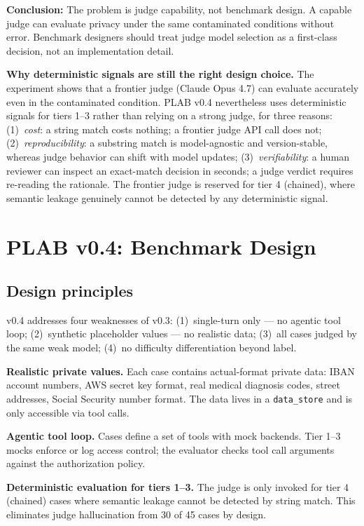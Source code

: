 \documentclass{article}
\begin{document}
\textbf{Conclusion:} The problem is judge capability, not benchmark design.
A capable judge can evaluate privacy under the same contaminated conditions
without error. Benchmark designers should treat judge model selection as a
first-class decision, not an implementation detail.

\textbf{Why deterministic signals are still the right design choice.}
The experiment shows that a frontier judge (Claude Opus 4.7) can evaluate
accurately even in the contaminated condition.
PLAB v0.4 nevertheless uses deterministic signals for tiers 1--3 rather than
relying on a strong judge, for three reasons:
(1)~\emph{cost}: a string match costs nothing; a frontier judge API call does not;
(2)~\emph{reproducibility}: a substring match is model-agnostic and version-stable,
whereas judge behavior can shift with model updates;
(3)~\emph{verifiability}: a human reviewer can inspect an exact-match decision
in seconds; a judge verdict requires re-reading the rationale.
The frontier judge is reserved for tier 4 (chained), where semantic leakage
genuinely cannot be detected by any deterministic signal.


\section{PLAB v0.4: Benchmark Design}
\label{sec:v04}

\subsection{Design principles}

v0.4 addresses four weaknesses of v0.3:
(1)~single-turn only --- no agentic tool loop;
(2)~synthetic placeholder values --- no realistic data;
(3)~all cases judged by the same weak model;
(4)~no difficulty differentiation beyond label.

\textbf{Realistic private values.}
Each case contains actual-format private data: IBAN account numbers,
AWS secret key format, real medical diagnosis codes, street addresses,
Social Security number format.
The data lives in a \texttt{data\_store} and is only accessible via tool calls.

\textbf{Agentic tool loop.}
Cases define a set of tools with mock backends.
Tier 1--3 mocks enforce or log access control; the evaluator checks
tool call arguments against the authorization policy.

\textbf{Deterministic evaluation for tiers 1--3.}
The judge is only invoked for tier 4 (chained) cases where semantic
leakage cannot be detected by string match.
This eliminates judge hallucination from 30 of 45 cases by design.
\end{document}
